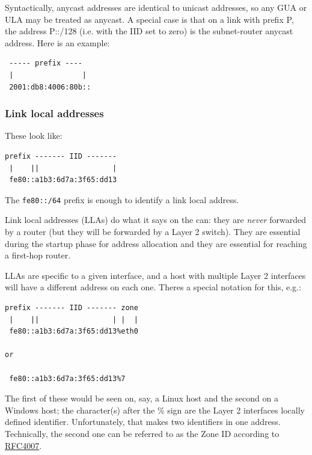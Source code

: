 \documentclass[
]{article}
\begin{document}
Syntactically, anycast addresses are identical to unicast addresses, so
any GUA or ULA may be treated as anycast. A special case is that on a
link with prefix P, the address P::/128 (i.e. with the IID set to zero)
is the subnet-router anycast address. Here is an example:

\begin{verbatim}
 ----- prefix ----
 |                |
 2001:db8:4006:80b::
\end{verbatim}

\subsubsection{Link local addresses}\label{link-local-addresses}

These look like:

\begin{verbatim}
prefix ------- IID -------
 |    ||                 |
 fe80::a1b3:6d7a:3f65:dd13
\end{verbatim}

The \texttt{fe80::/64} prefix is enough to identify a link local
address.

Link local addresses (LLAs) do what it says on the can: they are
\emph{never} forwarded by a router (but they will be forwarded by a
Layer 2 switch). They are essential during the startup phase for address
allocation and they are essential for reaching a first-hop router.

LLAs are specific to a given interface, and a host with multiple Layer 2
interfaces will have a different address on each one.
There\textquotesingle s a special notation for this, e.g.:

\begin{verbatim}
prefix ------- IID ------- zone
 |    ||                 | |  |
 fe80::a1b3:6d7a:3f65:dd13%eth0

or

 fe80::a1b3:6d7a:3f65:dd13%7
\end{verbatim}

The first of these would be seen on, say, a Linux host and the second on
a Windows host; the character(s) after the
\textquotesingle\%\textquotesingle{} sign are the Layer 2
interface\textquotesingle s locally defined identifier. Unfortunately,
that makes two \textquotesingle identifiers\textquotesingle{} in one
address. Technically, the second one can be referred to as the
\textquotesingle Zone ID\textquotesingle{} according to
\href{https://www.rfc-editor.org/info/rfc4007}{RFC4007}.
\end{document}
